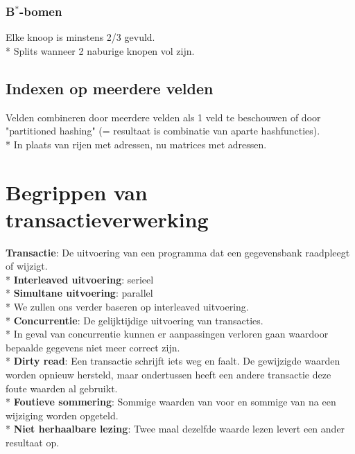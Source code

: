 \documentclass[10pt]{article}
\begin{document}
\subsubsection{B$^*$-bomen}
Elke knoop is minstens 2/3 gevuld.\\*
Splits wanneer 2 naburige knopen vol zijn.
\subsection{Indexen op meerdere velden}
Velden combineren door meerdere velden als 1 veld te beschouwen of door "partitioned hashing" (= resultaat is combinatie van aparte hashfuncties).\\*
In plaats van rijen met adressen, nu matrices met adressen.
\section{Begrippen van transactieverwerking}
\textbf{Transactie}: De uitvoering van een programma dat een gegevensbank raadpleegt of wijzigt.\\*
\textbf{Interleaved uitvoering}: serieel\\*
\textbf{Simultane uitvoering}: parallel\\*
We zullen ons verder baseren op interleaved uitvoering.\\*
\textbf{Concurrentie}: De gelijktijdige uitvoering van transacties.\\*
In geval van concurrentie kunnen er aanpassingen verloren gaan waardoor bepaalde gegevens niet meer correct zijn.\\*
\textbf{Dirty read}: Een transactie schrijft iets weg en faalt. De gewijzigde waarden worden opnieuw hersteld, maar ondertussen heeft een andere transactie deze foute waarden al gebruikt.\\*
\textbf{Foutieve sommering}: Sommige waarden van voor en sommige van na een wijziging worden opgeteld.\\*
\textbf{Niet herhaalbare lezing}: Twee maal dezelfde waarde lezen levert een ander resultaat op.
\end{document}
